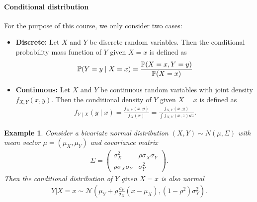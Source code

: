 \documentclass[11pt,letterpaper]{article}
\newtheorem{example}{Example}
\begin{document}
\paragraph{Conditional distribution}
For the purpose of this course, we only consider two cases:
\begin{itemize}
  \item \textbf{Discrete:} Let $X$ and $Y$ be discrete random variables. Then the conditional probability mass function of $Y$ given $X = x$ is defined as
  \begin{align*}
    {\mathbb{P}}(Y = y \mid X = x) = \frac{{\mathbb{P}}(X = x, Y = y)}{{\mathbb{P}}(X = x)}
  \end{align*}
  \item \textbf{Continuous:} Let $X$ and $Y$ be continuous random variables with joint density $f_{X,Y}(x,y)$. Then the conditional density of $Y$ given $X = x$ is defined as
  \begin{align*}
    f_{Y \mid X}(y \mid x) = \frac{f_{X,Y}(x,y)}{f_X(x)} = \frac{f_{X, Y} (x, y)}{\int f_{X,Y}(x,z) dz}.
  \end{align*}
\end{itemize}
\begin{example}
Consider a bivariate normal distribution $(X,Y) \sim N(\mu, \Sigma)$ with mean vector $\mu = (\mu_X, \mu_Y)$ and covariance matrix
\begin{align*}
  \Sigma = \begin{pmatrix}
    \sigma_X^2 & \rho \sigma_X \sigma_Y \\
    \rho \sigma_X \sigma_Y & \sigma_Y^2 
  \end{pmatrix}.
\end{align*}
Then the conditional distribution of $Y$ given $X = x$ is also normal
\begin{align*}
  Y |X = x \sim \mathcal{N}\left(\mu_Y + \rho \frac{\sigma_Y}{\sigma_X} (x - \mu_X), (1 - \rho^2) \sigma_Y^2\right).
\end{align*}
\end{example}
\end{document}
